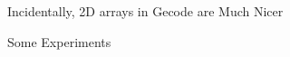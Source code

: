\documentclass{beamer}
\begin{document}
\begin{frame}[fragile]{Incidentally, 2D arrays in Gecode are Much Nicer}
    
\end{frame}

\begin{frame}{Some Experiments}
     {
        
    }
     {
        \begin{columns}
            \begin{column}{0.45\textwidth}
                
            \end{column}
            \begin{column}{0.45\textwidth}
            \end{column}
        \end{columns}
    }

     {
        
    }
     {
        \begin{columns}
            \begin{column}{0.45\textwidth}
                
            \end{column}
            \begin{column}{0.45\textwidth}
            \end{column}
        \end{columns}
    }

     {
        
    }
     {
        \begin{columns}
            \begin{column}{0.45\textwidth}
                
            \end{column}
            \begin{column}{0.45\textwidth}
            \end{column}
        \end{columns}
    }


\end{frame}
\end{document}
